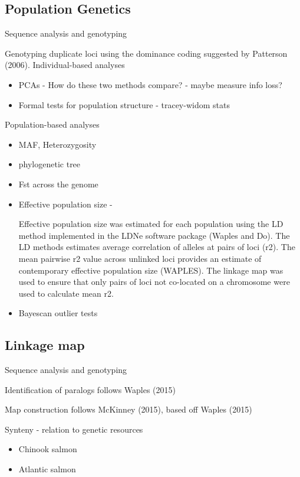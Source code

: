 \documentclass[12pt,  one column]{article}
\begin{document}
\subsection*{Population Genetics}
Sequence analysis and genotyping

Genotyping duplicate loci using the dominance coding suggested by Patterson (2006). 
Individual-based analyses
\begin{itemize}
    \item PCAs - How do these two methods compare? - maybe measure info loss?
    \item Formal tests for population structure - tracey-widom stats

\end{itemize}

Population-based analyses
\begin{itemize}
	\item MAF, Heterozygosity
    \item phylogenetic tree
	\item Fst across the genome
    \item Effective population size - 
    
    	Effective population size was estimated for each population using the LD method implemented in the LDNe software package (Waples and Do).  The LD methods estimates average  correlation of alleles at pairs of loci (r2). The mean pairwise r2 value across unlinked loci provides an estimate of contemporary effective population size (WAPLES). The linkage map was used to ensure that only pairs of loci not co-located on a chromosome were used to calculate mean r2. 
    \item Bayescan outlier tests
\end{itemize}

\subsection*{Linkage map}

Sequence analysis and genotyping

Identification of paralogs follows Waples (2015)

Map construction follows McKinney (2015), based off Waples (2015)

Synteny - relation to genetic resources
\begin{itemize}
	\item Chinook salmon
    \item Atlantic salmon
\end{itemize}
\end{document}
